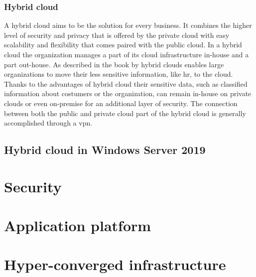 \subsubsection{Hybrid cloud}
A hybrid cloud aims to be the solution for every business. It combines the higher level of security and privacy that is offered by the private cloud with easy scalability and flexibility that comes paired with the public cloud. In a hybrid cloud the organization manages a part of its cloud infrastructure in-house and a part out-house. As described in the book by \textcite{Sarna2010} hybrid clouds enables large organizations to move their less sensitive information, like \acrfull{hr}, to the cloud. Thanks to the advantages of hybrid cloud their sensitive data, such as classified information about costumers or the organization, can remain in-house on private clouds or even on-premise for an additional layer of security. The connection between both the public and private cloud part of the hybrid cloud is generally accomplished through a \acrfull{vpn}.


\subsection{Hybrid cloud in Windows Server 2019}


\section{Security}

\section{Application platform}

\section{Hyper-converged infrastructure}